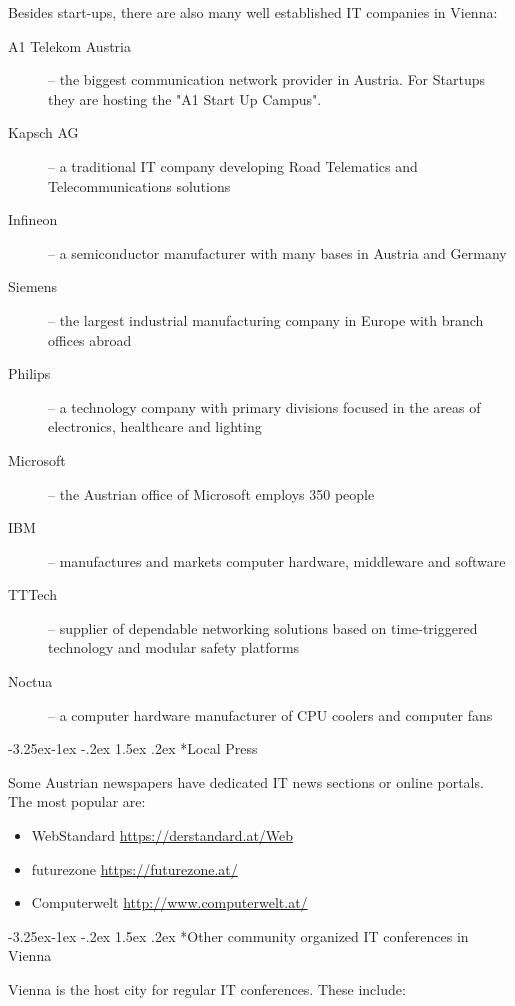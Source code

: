 \documentclass[10pt,a4paper]{article}
\makeatletter
\renewcommand\subsection{%
\@startsection{subsection}{2}{\z@}%
              {-3.25ex\@plus -1ex \@minus -.2ex}%
              {1.5ex \@plus .2ex}%
              {\color{kdelight}\sffamily\Large\bfseries}}
\makeatother
\begin{document}
Besides start-ups, there are also many well established IT companies in Vienna:
\begin{description}
	\item[\color{kdedarker} A1 Telekom Austria] -- the biggest communication network provider in Austria. For Startups they are hosting the "A1 Start Up Campus".
	\item[\color{kdedarker} Kapsch AG] -- a traditional IT company developing Road Telematics and Telecommunications solutions
	\item[\color{kdedarker} Infineon] -- a semiconductor manufacturer with many bases in Austria and Germany
	\item[\color{kdedarker} Siemens] -- the largest industrial manufacturing company in Europe with branch offices abroad
	\item[\color{kdedarker} Philips] -- a technology company with primary divisions focused in the areas of electronics, healthcare and lighting
	\item[\color{kdedarker} Microsoft] -- the Austrian office of Microsoft employs 350 people
	\item[\color{kdedarker} IBM] -- manufactures and markets computer hardware, middleware and software
	\item[\color{kdedarker} TTTech] -- supplier of dependable networking solutions based on time-triggered technology and modular safety platforms
	\item[\color{kdedarker} Noctua] -- a computer hardware manufacturer of CPU coolers and computer fans 
\end{description}

\subsection*{Local Press}
Some Austrian newspapers have dedicated IT news sections or online portals. The most popular are:

\begin{itemize}
\item WebStandard \url{https://derstandard.at/Web}
\item futurezone \url{https://futurezone.at/}
\item Computerwelt \url{http://www.computerwelt.at/}
\end{itemize}


\subsection*{Other community organized IT conferences in Vienna}
Vienna is the host city for regular IT conferences. These include:
\end{document}
